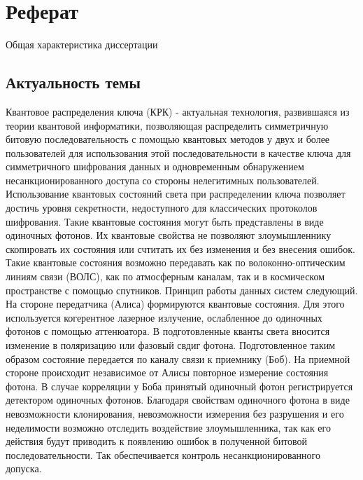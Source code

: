 \chapter*{Реферат}

\begin{center}
    Общая характеристика диссертации
\end{center}

\section*{Актуальность темы}
Квантовое распределения ключа (КРК) - актуальная технология, развившаяся из теории квантовой информатики, позволяющая распределить симметричную битовую последовательность с помощью квантовых методов у двух и более пользователей для использования этой последовательности в качестве ключа для симметричного шифрования данных и одновременным обнаружением несанкционированного доступа со стороны нелегитимных пользователей. Использование квантовых состояний света при распределении ключа позволяет достичь уровня секретности, недоступного для классических протоколов шифрования. Такие квантовые состояния могут быть представлены в виде одиночных фотонов. Их квантовые свойства не позволяют злоумышленнику скопировать их состояния или счтитать их без изменения и без внесения ошибок. Такие квантовые состояния возможно передавать как по волоконно-оптическим линиям связи (ВОЛС), как по атмосферным каналам, так и в космическом пространстве с помощью спутников. Принцип работы данных систем следующий. На стороне передатчика (Алиса) формируются квантовые состояния. Для этого используется когерентное лазерное излучение, ослабленное до одиночных фотонов с помощью  аттенюатора. В подготовленные кванты света вносится изменение в поляризацию или фазовый свдиг фотона. Подготовленное таким образом состояние передается по каналу связи к приемнику (Боб). На приемной стороне происходит независимое от Алисы повторное измерение состояния фотона. В случае корреляции у Боба принятый одиночный фотон регистрируется детектором одиночных фотонов. Благодаря свойствам одиночного фотона в виде невозможности клонирования, невозможности измерения без разрушения и его неделимости возможно отследить воздействие злоумышленника, так как его действия будут приводить к появлению ошибок в полученной битовой последовательности. Так обеспечивается контроль несанкционированного допуска. 

